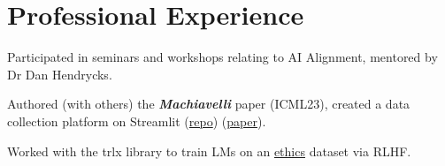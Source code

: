 \documentclass[]{deedy-resume-openfont}
\begin{document}
\begin{minipage}[t]{0.66\textwidth} 


\section{Professional Experience}
\vspace{\topsep} %
\begin{tightemize}
\item Participated in seminars and workshops relating to AI Alignment, mentored by Dr Dan Hendrycks.
\item Authored (with others) the \emph{\textbf{Machiavelli}}
paper (ICML23), created a data collection platform on Streamlit (\href{https://github.com/derpyplops/cyoa-streamlit}{repo})
(\href{https://arxiv.org/abs/2304.03279}{paper}).
\item Worked with the trlx library to train LMs on an \href{https://github.com/hendrycks/ethics}{ethics} dataset via RLHF.


\end{tightemize}
\end{minipage}
\end{document}
